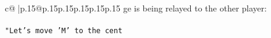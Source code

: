 \documentclass{article}
\begin{document}
{\begin{supertabular}{c@{$\;$}|p{.15\linewidth}@{}p{.15\linewidth}p{.15\linewidth}p{.15\linewidth}p{.15\linewidth}p{.15\linewidth}}
{{{ge is being relayed to the other player:\\ \tt \\ \tt "Let's move 'M' to the cent}}}
\end{supertabular}}
\end{document}
